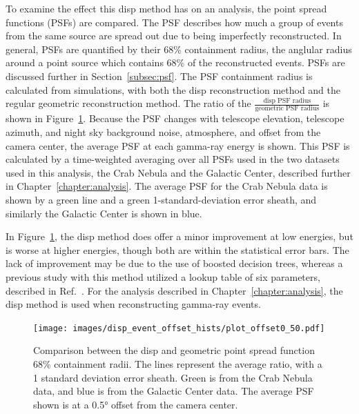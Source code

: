 To examine the effect this disp method has on an analysis, the point spread functions (PSFs) are compared.
The PSF describes how much a group of events from the same source are spread out due to being imperfectly reconstructed.
In general, PSFs are quantified by their 68\% containment radius, the anglular radius around a point source which contains 68\% of the reconstructed events.
PSFs are discussed further in Section~\ref{subsec:psf}.
The PSF containment radius is calculated from simulations, with both the disp reconstruction method and the regular geometric reconstruction method.
The ratio of the $\frac{\textrm{disp PSF radius}}{\textrm{geometric PSF radius}}$ is shown in Figure~\ref{fig:disp_psf_comparison}.
Because the PSF changes with telescope elevation, telescope azimuth, and night sky background noise, atmosphere, and offset from the camera center, the average PSF at each gamma-ray energy is shown.
This PSF is calculated by a time-weighted averaging over all PSFs used in the two datasets used in this analysis, the Crab Nebula and the Galactic Center, described further in Chapter~\ref{chapter:analysis}.
The average PSF for the Crab Nebula data is shown by a green line and a green 1-standard-deviation error sheath, and similarly the Galactic Center is shown in blue.
    
In Figure~\ref{fig:disp_psf_comparison}, the disp method does offer a minor improvement at low energies, but is worse at higher energies, though both are within the statistical error bars.
The lack of improvement may be due to the use of boosted decision trees, whereas a previous study with this method utilized a lookup table of six parameters, described in Ref.~\cite{Beilicke2012NIM}.
For the analysis described in Chapter~\ref{chapter:analysis}, the disp method is used when reconstructing gamma-ray events.
    
\begin{figure}[b]
  \centering
  \texttt{[image: images/disp\_event\_offset\_hists/plot\_offset0\_50.pdf]}
  \caption[DISP Point Spread Function Comparison]{
    Comparison between the disp and geometric point spread function 68\% containment radii.
    The lines represent the average ratio, with a 1 standard deviation error sheath.
    Green is from the Crab Nebula data, and blue is from the Galactic Center data.
    The average PSF shown is at a \ang{0.5} offset from the camera center.
  }
  \label{fig:disp_psf_comparison}
\end{figure}

\FloatBarrier

